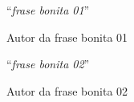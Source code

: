 \vfill
\begin{flushright}

``\textit{frase bonita 01}''\\

\vspace{0.4cm}

Autor da frase bonita 01

\end{flushright}

\vspace{0.5cm}

\begin{flushright}

``\textit{frase bonita 02}''\\

\vspace{0.4cm}

Autor da frase bonita 02

\end{flushright}

\vspace{2cm}
